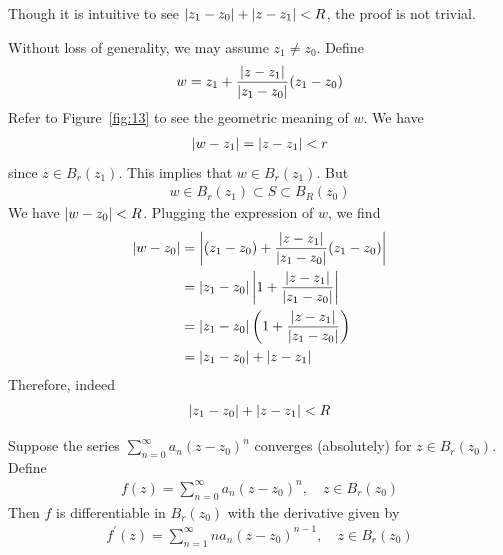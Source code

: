 \documentclass[thmcnt=section, 12pt]{my-elegantbook}
\begin{document}
Though it is intuitive to see $\left\lvert z_1 - z_0 \right\rvert + \left\lvert z - z_1 \right\rvert < R$, the proof is not trivial.

\begin{solution}
    Without loss of generality, we may assume $z_1 \neq z_0$. Define
    \begin{align*}
        w = z_1 + \frac{\left\lvert z - z_1 \right\rvert}{\left\lvert z_1 - z_0 \right\rvert} (z_1 - z_0)
    \end{align*}
    Refer to Figure~\ref{fig:13} to see the geometric meaning of $w$. We have 
    \begin{align*}
        \left\lvert w - z_1 \right\rvert = \left\lvert z - z_1 \right\rvert < r
    \end{align*}
    since $z \in B_r(z_1)$. This implies that $w \in B_r(z_1)$. But 
    \begin{align*}
        w \in B_r(z_1) \subset S \subset B_R(z_0)
    \end{align*}
    We have $\left\lvert w - z_0 \right\rvert < R$. Plugging the expression of $w$, we find
    \begin{align*}
        \left\lvert w - z_0 \right\rvert &= \left\lvert (z_1 - z_0) + \frac{\left\lvert z - z_1 \right\rvert}{\left\lvert z_1 - z_0 \right\rvert} (z_1 - z_0) \right\rvert \\
        &= \left\lvert z_1 - z_0 \right\rvert \left\lvert 1 + \frac{\left\lvert z - z_1 \right\rvert}{\left\lvert z_1 - z_0 \right\rvert} \right\rvert \\
        &= \left\lvert z_1 - z_0 \right\rvert \left( 1 + \frac{\left\lvert z - z_1 \right\rvert}{\left\lvert z_1 - z_0 \right\rvert} \right) \\
        &= \left\lvert z_1 - z_0 \right\rvert + \left\lvert z - z_1 \right\rvert
    \end{align*}
    Therefore, indeed
    \begin{align*}
        \left\lvert z_1 - z_0 \right\rvert + \left\lvert z - z_1 \right\rvert < R
    \end{align*}
\end{solution}


\begin{theorem} \label{thm:64}
    Suppose the series $\sum_{n=0}^\infty a_n (z - z_0)^n$ converges (absolutely) for $z \in B_r(z_0)$. Define
    \begin{align*}
        f(z) = \sum_{n=0}^\infty a_n (z - z_0)^n,
        \quad z \in B_r(z_0)
    \end{align*}
    Then $f$ is differentiable in $B_r(z_0)$ with the derivative given by 
    \begin{align}
        f^\prime(z)
        = \sum_{n=1}^\infty n a_n (z - z_0)^{n-1},
        \quad z \in B_r(z_0)
        \label{eq:130}
    \end{align}
\end{theorem}
\end{document}

